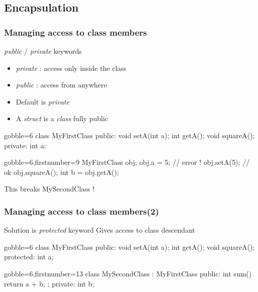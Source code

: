 \subsection{Encapsulation}

\begin{frame}[fragile]
  \frametitle{Managing access to class members}
  \begin{block}{{\it public} / {\it private} keywords}
    \begin{itemize}
      \item {\it private} : access only inside the class
      \item {\it public} : access from anywhere
      \item Default is {\it private}
      \item A {\it struct} is a {\it class} fully public
    \end{itemize}
  \end{block}
  \pause
  \begin{multicols}{2}
    \begin{cppcode*}{gobble=6}
      class MyFirstClass {
      public:
        void setA(int a);
        int getA();
        void squareA();
      private:
        int a;
      }
    \end{cppcode*}
    \columnbreak
    \begin{cppcode*}{gobble=6,firstnumber=9}
      MyFirstClass obj;
      obj.a = 5;   // error !
      obj.setA(5); // ok
      obj.squareA();
      int b = obj.getA();
    \end{cppcode*}
    \pause
    \begin{tcolorbox}[left=0mm,right=0mm,top=0mm,bottom=0mm,colback=red!5!white,colframe=red!75!black]
      This breaks MySecondClass !
    \end{tcolorbox}
  \end{multicols}
\end{frame}

\begin{frame}[fragile]
  \frametitle{Managing access to class members(2)}
  \begin{block}{Solution is {\it protected} keyword}
    Gives access to class descendant
  \end{block}
  \begin{multicols}{2}
    \begin{cppcode*}{gobble=6}
      class MyFirstClass {
      public:
        void setA(int a);
        int getA();
        void squareA();
      protected:
        int a;
      }
    \end{cppcode*}
    \columnbreak
    \begin{cppcode*}{gobble=6,firstnumber=13}
      class MySecondClass :
        MyFirstClass {
      public:
        int sum() {
          return a + b;
        };
      private:
        int b;
      }
    \end{cppcode*}
  \end{multicols}
\end{frame}


